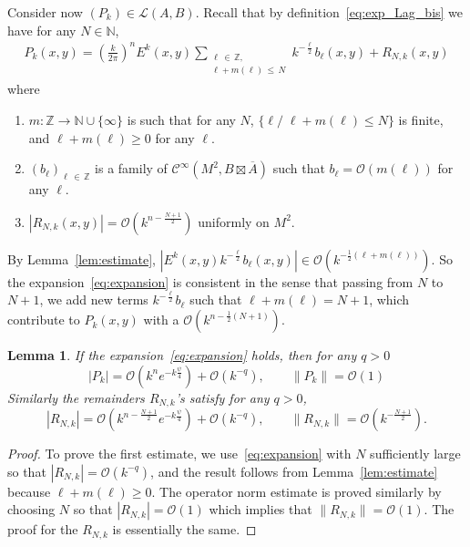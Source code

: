 \documentclass[10pt,a4paper]{article}
\newtheorem{lemm}[theo]{Lemma}
\theoremstyle{definition}
\numberwithin{equation}{section}
\newcommand{\N}{{\mathbb{N}}}
\newcommand{\Z}{{\mathbb{Z}}}
\newcommand{\con}{\overline}
\newcommand{\Ci}{{\mathcal{C}}^{\infty}}
\newcommand{\bigo}{\mathcal{O}}
\newcommand{\lag}{\mathcal{L}}
\newcommand*{\romanenumi}{\renewcommand*{\theenumi}{\roman{enumi}}}
\begin{document}
Consider now $(P_k) \in \lag (A,B)$. Recall that by definition~\eqref{eq:exp_Lag_bis} we have for any $N \in \N$, 
\begin{gather}\label{eq:expansion}
P_k (x,y) = \left(\frac{k}{2\pi} \right)^n E^k(x,y) \sum_{\substack{\ell\,\in\,\Z, \\
\ell + m (\ell)\,\leqslant\,N }} k^{- \frac{\ell}{2}} b_{\ell} (x,y) + R_{N,k} (x,y)
\end{gather}
where
\begin{enumerate}\romanenumi
\item $m : \Z \rightarrow \N \cup \{\infty \} $ is such that for any $N$, $\{ \ell/\; \ell + m(\ell) \leqslant N \}$ is finite, and $\ell + m (
\ell) \geqslant 0$ for any $\ell$.
\item $(b_{\ell})_{\ell\,\in\,\Z}$ is a family of $\Ci (M^2, B \boxtimes \con{A})$ such that $b _{\ell} = \bigo (m(
\ell))$ for any $\ell$.
\item $|R_{N,k} (x,y) | = \bigo (k^{n - \frac{N+1}{2}})$ uniformly on $M^2$.
\end{enumerate}
By Lemma~\ref{lem:estimate}, $| E^k(x,y) k^{-\frac{\ell}{ 2}} b_{\ell}(x,y) | \in \bigo (k^{ - \frac{1}{2} (\ell + m (\ell))})$. So the expansion~\eqref{eq:expansion} is consistent in the sense that passing from $N$ to $N+1$, we add new terms $k^{-\frac{\ell}{2}} b_\ell$ such that $\ell + m (\ell) = N+1$, which contribute to $P_k (x,y)$ with a $\bigo (k^{n -\frac{1}{2}(N+1)})$.

\begin{lemm}\label{lem:estim_expansion}
If the expansion~\eqref{eq:expansion} holds, then for any $q>0$
\[
|P_k | = \bigo \left(k^{n} e^{- k
\frac{\psi }{4}} \right) + \bigo \left(k^{-q}\right),  \qquad \| P_k \| = \bigo (1)
\]
Similarly the remainders $R_{N,k}$'s satisfy for any $q>0$,
\[
 |R_{N,k} | = \bigo \left(k^{n- \frac{N+1}{2}} e^{- k
\frac{\psi }{4}} \right) + \bigo\left(k^{-q}\right),  \qquad \| R_{N,k} \| = \bigo
\left(k^{-\frac{N+1}{2}}\right).
\]
\end{lemm}

\begin{proof}
To prove the first estimate, we use~\eqref{eq:expansion} with $N$ sufficiently large so that $| R_{N,k} | = \bigo (k^{-q})$, and the result follows from Lemma~\ref{lem:estimate} because $\ell + m (\ell) \geqslant 0$. The operator norm estimate is proved similarly by choosing $N$ so that $|R_{N,k} | =\bigo (1)$ which implies that $\| R_{N,k} \| = \bigo (1)$. The proof for the $R_{N,k}$ is essentially the same.
\end{proof}
\end{document}
